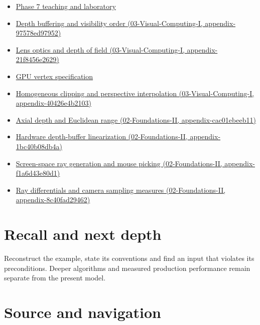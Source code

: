 \begin{itemize}
\item
  \href{Continuous\%20Notes/Computing\%20Foundations\%20-\%20From\%20Bits\%20to\%20C++\%20and\%20Systems\%20APIs\#Keep\%20the\%20promises\%20visible\%20while\%20moving\%20between\%20representations}{Phase 7 teaching and laboratory}
\item
  \href{../03-Visual-Computing-I/main.pdf\#nameddest=appendix-97578ed97952}{Depth buffering and visibility order (03-Visual-Computing-I, appendix-97578ed97952)}
\item
  \href{../03-Visual-Computing-I/main.pdf\#nameddest=appendix-21f8456e2629}{Lens optics and depth of field (03-Visual-Computing-I, appendix-21f8456e2629)}
\item
  \hyperref[appendix-749ba51a6c25]{GPU vertex specification}
\item
  \href{../03-Visual-Computing-I/main.pdf\#nameddest=appendix-40426e4b2103}{Homogeneous clipping and perspective interpolation (03-Visual-Computing-I, appendix-40426e4b2103)}
\item
  \href{../02-Foundations-II/main.pdf\#nameddest=appendix-cac01ebeeb11}{Axial depth and Euclidean range (02-Foundations-II, appendix-cac01ebeeb11)}
\item
  \href{../02-Foundations-II/main.pdf\#nameddest=appendix-1bc40b08db4a}{Hardware depth-buffer linearization (02-Foundations-II, appendix-1bc40b08db4a)}
\item
  \href{../02-Foundations-II/main.pdf\#nameddest=appendix-f1a6d43e80d1}{Screen-space ray generation and mouse picking (02-Foundations-II, appendix-f1a6d43e80d1)}
\item
  \href{../02-Foundations-II/main.pdf\#nameddest=appendix-8c40fad29462}{Ray differentials and camera sampling measures (02-Foundations-II, appendix-8c40fad29462)}
\end{itemize}

\section{Recall and next depth}\label{appendix-1c07d64f5e70-recall-and-next-depth}

Reconstruct the example, state its conventions and find an input that violates its preconditions. Deeper algorithms and measured production performance remain separate from the present model.

\section{Source and navigation}\label{appendix-1c07d64f5e70-source-and-navigation}


